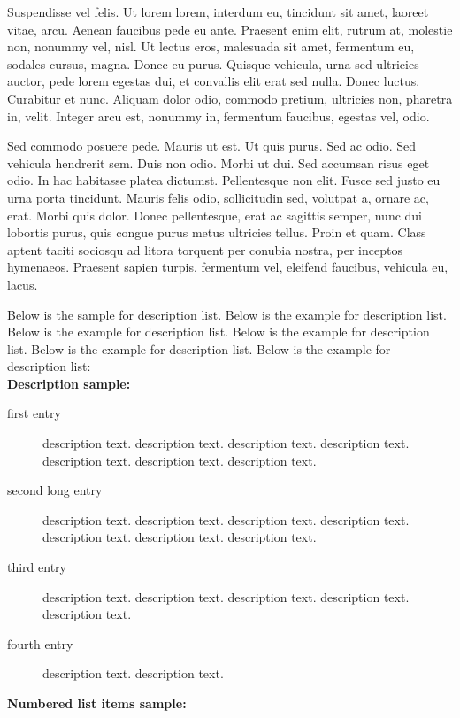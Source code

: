 \documentclass[AMA,STIX1COL]{WileyNJD-SP}
\begin{document}
Suspendisse vel felis. Ut lorem lorem, interdum eu, tincidunt sit amet, laoreet vitae, arcu. Aenean faucibus pede eu
ante. Praesent enim elit, rutrum at, molestie non, nonummy vel, nisl. Ut lectus eros, malesuada sit amet, fermentum
eu, sodales cursus, magna. Donec eu purus. Quisque vehicula, urna sed ultricies auctor, pede lorem egestas dui, et
convallis elit erat sed nulla. Donec luctus. Curabitur et nunc. Aliquam dolor odio, commodo pretium, ultricies non,
pharetra in, velit. Integer arcu est, nonummy in, fermentum faucibus, egestas vel, odio.

Sed commodo posuere pede. Mauris ut est. Ut quis purus. Sed ac odio. Sed vehicula hendrerit sem. Duis non
odio. Morbi ut dui. Sed accumsan risus eget odio. In hac habitasse platea dictumst. Pellentesque non elit. Fusce
sed justo eu urna porta tincidunt. Mauris felis odio, sollicitudin sed, volutpat a, ornare ac, erat. Morbi quis dolor. Donec pellentesque, erat ac sagittis semper, nunc dui lobortis purus, quis congue purus metus ultricies tellus. Proin
et quam. Class aptent taciti sociosqu ad litora torquent per conubia nostra, per inceptos hymenaeos. Praesent sapien
turpis, fermentum vel, eleifend faucibus, vehicula eu, lacus.


Below is the sample for description list. Below is the example for description list. Below is the example for description list. Below is the example for description list. Below is the example for description list. Below is the example for description list:\\[12pt]


\noindent\textbf{Description sample:}

\begin{description}
\item[first entry] description text. description text.\cite{Kucharik2011,Kucharik2014,Loubere2005} description text. description text. description text. description text. description text. 
\item[second long entry] description text. description text. description text. description text. description text. description text. description text. 
\item[third entry] description text. description text. description text. description text. description text. 
\item[fourth entry] description text. description text. 
\end{description}


\noindent\textbf{Numbered list items sample:}
\end{document}
